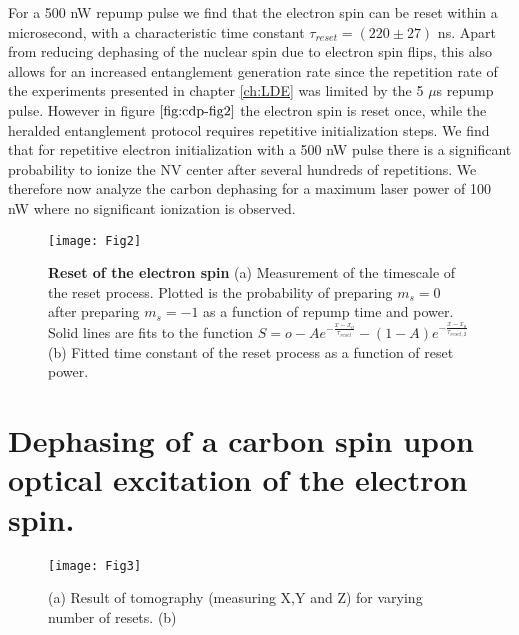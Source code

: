 For a 500 nW repump pulse we find that the electron spin can be reset within a microsecond, with a characteristic time constant $\tau_{reset} = (220 \pm 27) $ ns. Apart from reducing dephasing of the nuclear spin due to electron spin flips, this also allows for an increased entanglement generation rate since the repetition rate of the experiments presented in chapter \ref{ch:LDE} was limited by the 5 $\mu$s repump pulse. However in figure $\ref{fig:cdp-fig2}$ the electron spin is reset once, while the heralded entanglement protocol requires repetitive initialization steps. We find that for repetitive electron initialization with a 500 nW pulse there is a significant probability to ionize the NV center after several hundreds of repetitions. We therefore now analyze the carbon dephasing for a maximum laser power of 100 nW where no significant ionization is observed.

 \begin{figure*}
	\centering
	\texttt{[image: Fig2]}
	\caption{\label{fig:cdp-fig2} \textbf{Reset of the electron spin} (a) Measurement of the timescale of the reset process. Plotted is the probability of preparing $m_s = 0$ after preparing $m_s = -1$ as a function of repump time and power. Solid lines are fits to the function $S = o - A e^{-\frac{x-x_o}{\tau_{reset}}}-(1-A) e^{-\frac{x-x_o}{\tau_{reset,2}}}$ (b) Fitted time constant of the reset process as a function of reset power.}
\end{figure*}

\section{Dephasing of a carbon spin upon optical excitation of the electron spin.}

 
 \begin{figure*}
	\centering
	\texttt{[image: Fig3]}
	\caption{\label{fig:cdp-fig3} \textbf{} (a) Result of tomography (measuring X,Y and Z) for varying number of resets. (b) }
\end{figure*}

\clearpage




